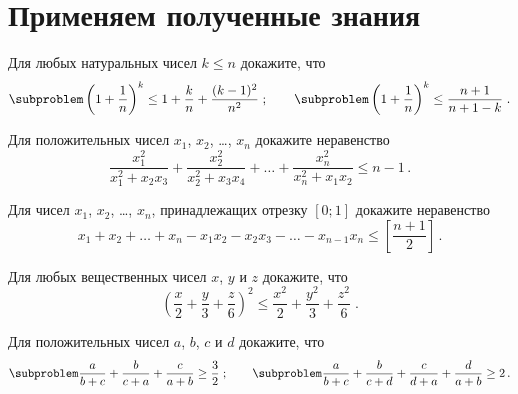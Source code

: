 
\section*{Применяем полученные знания}


\begin{problems}

\item
Для любых натуральных чисел $k \leq n$ докажите, что
\[
\subproblem
    \left( 1 + \frac{1}{n} \right)^{k}
\leq
    1 + \frac{k}{n} + \frac{(k - 1)^2}{n^2}
\; ; \qquad
\subproblem
    \left( 1 + \frac{1}{n} \right)^{k}
\leq
    \frac{n + 1}{n + 1 - k}
\; . \]

\item
Для положительных чисел $x_{1}$, $x_{2}$, \ldots, $x_{n}$ докажите неравенство
\[
    \frac{x_{1}^2}{x_{1}^2 + x_{2} x_{3}} +
    \frac{x_{2}^2}{x_{2}^2 + x_{3} x_{4}} +
    \ldots +
    \frac{x_{n}^2}{x_{n}^2 + x_{1} x_{2}}
\leq
    n - 1
\, . \]

\item
Для чисел $x_{1}$, $x_{2}$, \ldots, $x_{n}$, принадлежащих отрезку $[0; 1]$
докажите неравенство
\[
    x_{1} + x_{2} + \ldots + x_{n}
    - x_{1} x_{2} - x_{2} x_{3} - \ldots - x_{n-1} x_{n}
\leq
    \left[ \frac{n + 1}{2} \right]
\, . \]

\item
Для любых вещественных чисел $x$, $y$ и $z$ докажите, что
\[
    \left(
        \frac{x}{2} + \frac{y}{3} + \frac{z}{6}
    \right)^2
\leq
    \frac{x^2}{2} + \frac{y^2}{3} + \frac{z^2}{6}
\; . \]

\item
Для положительных чисел $a$, $b$, $c$ и $d$ докажите, что
\[
\subproblem
    \frac{a}{b + c} + \frac{b}{c + a} + \frac{c}{a + b}
\geq
    \frac{3}{2}
\; ; \qquad
\subproblem
    \frac{a}{b + c} + \frac{b}{c + d} + \frac{c}{d + a} + \frac{d}{a + b}
\geq
    2
\, . \]

\end{problems}

